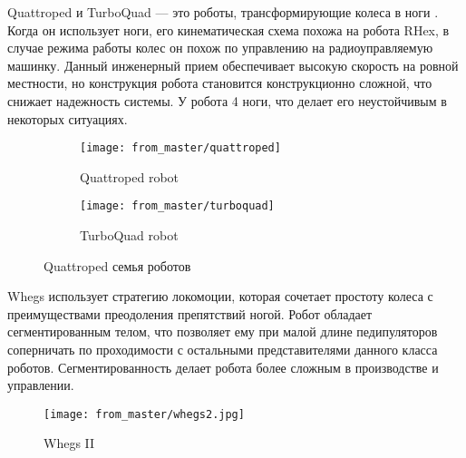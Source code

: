 Quattroped и TurboQuad \cite{shenDesignLegwheelHybrid2009, Chen2014, Chen2017} --- это роботы, трансформирующие колеса в ноги . Когда он использует ноги, его кинематическая схема похожа на робота RHex, в случае режима работы колес он похож по управлению на радиоуправляемую машинку. Данный инженерный прием обеспечивает высокую скорость на ровной местности, но конструкция робота становится конструкционно сложной, что снижает надежность системы. У робота 4 ноги, что делает его неустойчивым в некоторых ситуациях.

\begin{figure}[H]
    \begin{subfigure}{0.49\textwidth}
    \centering\texttt{[image: from\_master/quattroped]}\\
    \caption{Quattroped robot}
    \label{fig:quattroped}
    \end{subfigure}
    \begin{subfigure}{0.49\textwidth}
    \centering\texttt{[image: from\_master/turboquad]}\\
    \caption{TurboQuad robot}
    \label{fig:turboquad}
    \end{subfigure}
    \caption{Quattroped семья роботов}
    \label{quatro}
    \end{figure}

Whegs \cite{schroerComparingCockroachWhegs2004}  использует стратегию локомоции, которая сочетает простоту колеса с преимуществами преодоления препятствий ногой. Робот обладает сегментированным телом, что позволяет ему при малой длине педипуляторов соперничать по проходимости с остальными представителями данного класса роботов. Сегментированность делает робота более сложным в производстве и управлении.

\begin{figure}[H]
\centering\texttt{[image: from\_master/whegs2.jpg]}\\
\caption{Whegs II}
\label{fig:whegs}
\end{figure}

